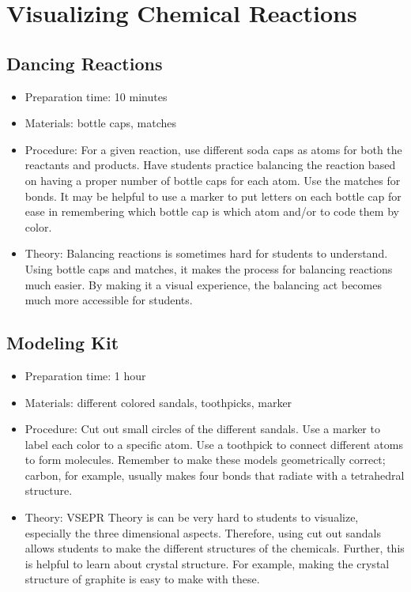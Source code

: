 \section{Visualizing Chemical Reactions}

\subsection{Dancing Reactions}
\begin{itemize}
\item{Preparation time: 10 minutes}
\item{Materials: bottle caps, matches}
\item{Procedure: For a given reaction, use different soda caps as atoms for both the reactants and products. Have students practice balancing the reaction based on having a proper number of bottle caps for each atom. Use the matches for bonds. It may be helpful to use a marker to put letters on each bottle cap for ease in remembering which bottle cap is which atom and/or to code them by color.}
\item{Theory: Balancing reactions is sometimes hard for students to understand. Using bottle caps and matches, it makes the process for balancing reactions much easier. By making it a visual experience, the balancing act becomes much more accessible for students.}
\end{itemize}

\subsection{Modeling Kit}
\begin{itemize}
\item{Preparation time: 1 hour}
\item{Materials: different colored sandals, toothpicks, marker}
\item{Procedure: Cut out small circles of the different sandals. Use a marker to label each color to a specific atom. Use a toothpick to connect different atoms to form molecules. Remember to make these models geometrically correct; carbon, for example, usually makes four bonds that radiate with a tetrahedral structure.}
\item{Theory: VSEPR Theory is can be very hard to students to visualize, especially the three dimensional aspects. Therefore, using cut out sandals allows students to make the different structures of the chemicals. Further, this is helpful to learn about crystal structure. For example, making the crystal structure of graphite is easy to make with these.}
\end{itemize}

